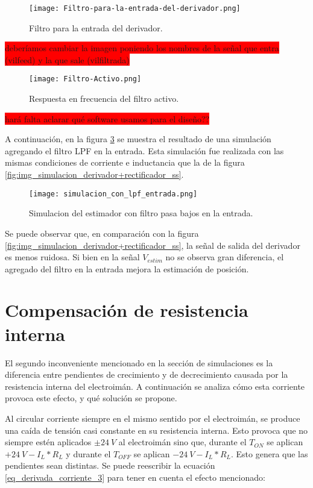 \begin{figure}[H]
	\centering
	\texttt{[image: Filtro-para-la-entrada-del-derivador.png]}
	\caption{Filtro para la entrada del derivador.}
	\label{fig:img_Filtro-para-la-entrada-del-derivador}
\end{figure}

\colorbox{red}{deberíamos cambiar la imagen poniendo los nombres de la señal que entra (vilfeed) y la que sale (vilfiltrada)}
\begin{figure}[H]
	\centering
	\texttt{[image: Filtro-Activo.png]}
	\caption{Respuesta en frecuencia del filtro activo.}
	\label{fig:img_Respuesta-en-frecuencia-del-filtro-activo}
\end{figure}

\colorbox{red}{hará falta aclarar qué software usamos para el diseño??}

A continuación, en la figura \ref{fig:img_simulacion_lpf_entrada} se muestra el resultado de una simulación agregando el filtro LPF en la entrada. Esta simulación fue realizada con las mismas condiciones de corriente e inductancia que la de la figura \ref{fig:img_simulacion_derivador+rectificador_ss}.

\begin{figure}[H]
	\centering
	\texttt{[image: simulacion\_con\_lpf\_entrada.png]}
	\caption{Simulacion del estimador con filtro pasa 	bajos en la entrada.}
	\label{fig:img_simulacion_lpf_entrada}
\end{figure}

Se puede observar que, en comparación con la figura \ref{fig:img_simulacion_derivador+rectificador_ss}, la señal de salida del derivador es menos ruidosa. Si bien en la señal $V_{estim}$ no se observa gran diferencia, el agregado del filtro en la entrada mejora la estimación de posición.

\section{Compensación de resistencia interna}

El segundo inconveniente mencionado en la sección de simulaciones es la diferencia entre pendientes de crecimiento y de decrecimiento causada por la resistencia interna del electroimán. A continuación se analiza cómo esta corriente provoca este efecto, y qué solución se propone.

Al circular corriente siempre en el mismo sentido por el electroimán, se produce una caída de tensión casi constante en su resistencia interna. Esto provoca que no siempre estén aplicados $\pm 24\:V$ al electroimán sino que, durante el $T_{ON}$ se aplican $+24\:V-I_L*R_L$ y durante el $T_{OFF}$ se aplican $-24\:V-I_L*R_L$. Esto genera que las pendientes sean distintas. Se puede reescribir la ecuación \ref{eq_derivada_corriente_3} para tener en cuenta el efecto mencionado:

